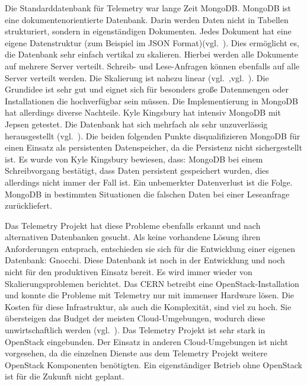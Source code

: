 \begin{outline}
  \1 Die Standarddatenbank für Telemetry war lange Zeit MongoDB\@. MongoDB ist
  eine dokumentenorientierte Datenbank. Darin werden Daten nicht in Tabellen
  strukturiert, sondern in eigenständigen Dokumenten. Jedes Dokument hat eine
  eigene Datenstruktur (zum Beispiel im \gls{JSON}
  Format)(vgl.~\cite{Dokumentenorientierte_Datenbank}). Dies ermöglicht es, die
  Datenbank sehr einfach vertikal zu skalieren. Hierbei werden alle Dokumente
  auf mehrere Server verteilt. Schreib- und Lese\hyp{}Anfragen können ebenfalls
  auf alle Server verteilt werden. Die Skalierung ist nahezu linear
  (vgl.~\cite{MongoDB_Architecture},vgl.~\cite{What_is_MongoDB}). Die Grundidee
  ist sehr gut und eignet sich für besonders große Datenmengen oder
  Installationen die hochverfügbar sein müssen. Die Implementierung in MongoDB
  hat allerdings diverse Nachteile. Kyle Kingsbury hat intensiv MongoDB mit
  \gls{Jepsen} getestet. Die Datenbank hat sich mehrfach als sehr unzuverlässig
  herausgestellt (vgl.~\cite{MongoDB_on_Jepsen}). Die beiden folgenden Punkte
  disqualifizieren MongoDB für einen Einsatz als persistenten Datenspeicher, da
  die Persistenz nicht sichergestellt ist. Es wurde von Kyle Kingsbury
  bewiesen, dass:
    \2 MongoDB bei einem Schreibvorgang bestätigt, dass Daten persistent
    gespeichert wurden, dies allerdings nicht immer der Fall ist. Ein
    unbemerkter Datenverlust ist die Folge.
    \2 MongoDB in bestimmten Situationen die falschen Daten bei einer
    Leseanfrage zurückliefert.

  \1 Das Telemetry Projekt hat diese Probleme ebenfalls erkannt und nach
  alternativen Datenbanken gesucht. Als keine vorhandene Lösung ihren
  Anforderungen entsprach, entschieden sie sich für die Entwicklung einer
  eigenen Datenbank: \gls{Gnocchi}. Diese Datenbank ist noch in der Entwicklung
  und noch nicht für den produktiven Einsatz bereit.
  \1 Es wird immer wieder von Skalierungsproblemen berichtet. Das CERN betreibt
  eine OpenStack\hyp{}Installation und konnte die Probleme mit Telemetry nur
  mit immenser Hardware lösen. Die Kosten für diese Infrastruktur, als auch die
  Komplexität, sind viel zu hoch. Sie übersteigen das Budget der meisten
  Cloud\hyp{}Umgebungen, wodurch diese unwirtschaftlich werden
  (vgl.~\cite{OpenStack_CERN}).
  \1 Das Telemetry Projekt ist sehr stark in OpenStack eingebunden. Der Einsatz
  in anderen Cloud\hyp{}Umgebungen ist nicht vorgesehen, da die einzelnen
  Dienste aus dem Telemetry Projekt weitere OpenStack Komponenten benötigten.
  Ein eigenständiger Betrieb ohne OpenStack ist für die Zukunft nicht geplant.
\end{outline}

